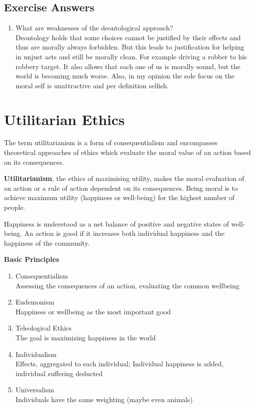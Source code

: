 \documentclass[11pt]{article}
\theoremstyle{definition}
\begin{document}
\subsection{Exercise Answers}
\begin{enumerate}
	\item What are weaknesses of the deontological approach?\\
	Deontology holds that some choices cannot be justified by their effects and thus are morally always forbidden. But this leads to justification for helping in unjust acts and still be morally clean. For example driving a robber to his robbery target. It also allows that each one of us is morally sound, but the world is becoming much worse. Also, in my opinion the sole focus on the moral self is unattractive and per definition selfish.
\end{enumerate}

\section{Utilitarian Ethics}
The term utilitarianism is a form of consequentialism and encompasses theoretical approaches of ethics which evaluate the moral value of an action based on its consequences.
\begin{definition}
	\textbf{Utilitarianism}, the ethics of maximising utility, makes the moral evaluation of an action or a rule of action dependent on its consequences. Being moral is to achieve maximum utility (happiness or well-being) for the highest number of people.
\end{definition}
Happiness is understood as a net balance of positive and negative states of well-being.  An action is good if it increases both individual happiness and the happiness of the community.

\vspace{1em}
\noindent
\textbf{Basic Principles}
\begin{enumerate}
	\item Consequentialism\\
	Assessing the consequences of an action, evaluating the common wellbeing
	\item Eudemonism\\
	Happiness or wellbeing as the most important good
	\item Teleological Ethics\\
	The goal is maximizing happiness in the world
	\item Individualism\\
	Effects, aggregated to each individual; Individual happiness is added, individual suffering deducted
	\item Universalism\\
	Individuals have the same weighting (maybe even animals)
\end{enumerate}
\end{document}
